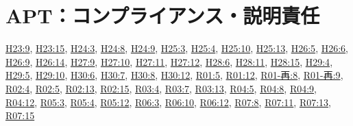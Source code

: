 \section{APT：コンプライアンス・説明責任}
\hyperref[q:h23-reg-apt-09]{H23:9}, \hyperref[q:h23-reg-apt-15]{H23:15}, \hyperref[q:h24-reg-apt-03]{H24:3}, \hyperref[q:h24-reg-apt-08]{H24:8}, \hyperref[q:h24-reg-apt-09]{H24:9}, \hyperref[q:h25-reg-apt-03]{H25:3}, \hyperref[q:h25-reg-apt-04]{H25:4}, \hyperref[q:h25-reg-apt-10]{H25:10}, \hyperref[q:h25-reg-apt-13]{H25:13}, \hyperref[q:h26-reg-apt-05]{H26:5}, \hyperref[q:h26-reg-apt-06]{H26:6}, \hyperref[q:h26-reg-apt-09]{H26:9}, \hyperref[q:h26-reg-apt-14]{H26:14}, \hyperref[q:h27-reg-apt-09]{H27:9}, \hyperref[q:h27-reg-apt-10]{H27:10}, \hyperref[q:h27-reg-apt-11]{H27:11}, \hyperref[q:h27-reg-apt-12]{H27:12}, \hyperref[q:h28-reg-apt-06]{H28:6}, \hyperref[q:h28-reg-apt-11]{H28:11}, \hyperref[q:h28-reg-apt-15]{H28:15}, \hyperref[q:h29-reg-apt-04]{H29:4}, \hyperref[q:h29-reg-apt-05]{H29:5}, \hyperref[q:h29-reg-apt-10]{H29:10}, \hyperref[q:h30-reg-apt-06]{H30:6}, \hyperref[q:h30-reg-apt-07]{H30:7}, \hyperref[q:h30-reg-apt-08]{H30:8}, \hyperref[q:h30-reg-apt-12]{H30:12}, \hyperref[q:r01-reg-apt-05]{R01:5}, \hyperref[q:r01-reg-apt-12]{R01:12}, \hyperref[q:r01-ret-apt-08]{R01-再:8}, \hyperref[q:r01-ret-apt-09]{R01-再:9}, \hyperref[q:r02-reg-apt-04]{R02:4}, \hyperref[q:r02-reg-apt-05]{R02:5}, \hyperref[q:r02-reg-apt-13]{R02:13}, \hyperref[q:r02-reg-apt-15]{R02:15}, \hyperref[q:r03-reg-apt-04]{R03:4}, \hyperref[q:r03-reg-apt-07]{R03:7}, \hyperref[q:r03-reg-apt-13]{R03:13}, \hyperref[q:r04-reg-apt-05]{R04:5}, \hyperref[q:r04-reg-apt-08]{R04:8}, \hyperref[q:r04-reg-apt-09]{R04:9}, \hyperref[q:r04-reg-apt-12]{R04:12}, \hyperref[q:r05-reg-apt-03]{R05:3}, \hyperref[q:r05-reg-apt-04]{R05:4}, \hyperref[q:r05-reg-apt-12]{R05:12}, \hyperref[q:r06-reg-apt-03]{R06:3}, \hyperref[q:r06-reg-apt-10]{R06:10}, \hyperref[q:r06-reg-apt-12]{R06:12}, \hyperref[q:r07-reg-apt-08]{R07:8}, \hyperref[q:r07-reg-apt-11]{R07:11}, \hyperref[q:r07-reg-apt-13]{R07:13}, \hyperref[q:r07-reg-apt-15]{R07:15}
